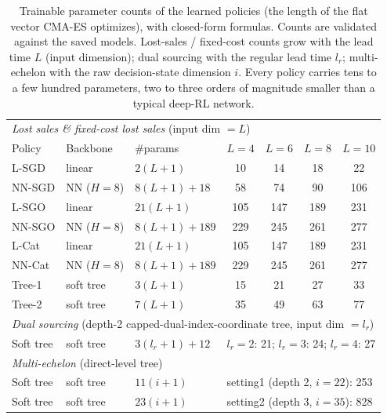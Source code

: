 \begin{table}[!htbp]
\centering
\small
\caption{Trainable parameter counts of the learned policies (the length of the flat vector CMA-ES optimizes), with closed-form formulas. Counts are validated against the saved models. Lost-sales / fixed-cost counts grow with the lead time $L$ (input dimension); dual sourcing with the regular lead time $l_r$; multi-echelon with the raw decision-state dimension $i$. Every policy carries tens to a few hundred parameters, two to three orders of magnitude smaller than a typical deep-RL network.}
\label{tab:param-counts}
\begin{tabular}{lllcccc}
\toprule
\multicolumn{7}{l}{\emph{Lost sales \& fixed-cost lost sales} (input dim $=L$)} \\
Policy & Backbone & \#params & $L{=}4$ & $L{=}6$ & $L{=}8$ & $L{=}10$ \\
\midrule
L-SGD & linear & $2(L{+}1)$ & 10 & 14 & 18 & 22 \\
NN-SGD & NN ($H{=}8$) & $8(L{+}1){+}18$ & 58 & 74 & 90 & 106 \\
L-SGO & linear & $21(L{+}1)$ & 105 & 147 & 189 & 231 \\
NN-SGO & NN ($H{=}8$) & $8(L{+}1){+}189$ & 229 & 245 & 261 & 277 \\
L-Cat & linear & $21(L{+}1)$ & 105 & 147 & 189 & 231 \\
NN-Cat & NN ($H{=}8$) & $8(L{+}1){+}189$ & 229 & 245 & 261 & 277 \\
Tree-1 & soft tree & $3(L{+}1)$ & 15 & 21 & 27 & 33 \\
Tree-2 & soft tree & $7(L{+}1)$ & 35 & 49 & 63 & 77 \\
\midrule
\multicolumn{7}{l}{\emph{Dual sourcing} (depth-2 capped-dual-index-coordinate tree, input dim $=l_r$)} \\
Soft tree & soft tree & $3(l_r{+}1){+}12$ & \multicolumn{4}{l}{$l_r{=}2$: 21; $l_r{=}3$: 24; $l_r{=}4$: 27} \\
\midrule
\multicolumn{7}{l}{\emph{Multi-echelon} (direct-level tree)} \\
Soft tree & soft tree & $11(i{+}1)$ & \multicolumn{4}{l}{setting1 (depth 2, $i=22$): 253} \\
Soft tree & soft tree & $23(i{+}1)$ & \multicolumn{4}{l}{setting2 (depth 3, $i=35$): 828} \\
\bottomrule
\end{tabular}
\end{table}
